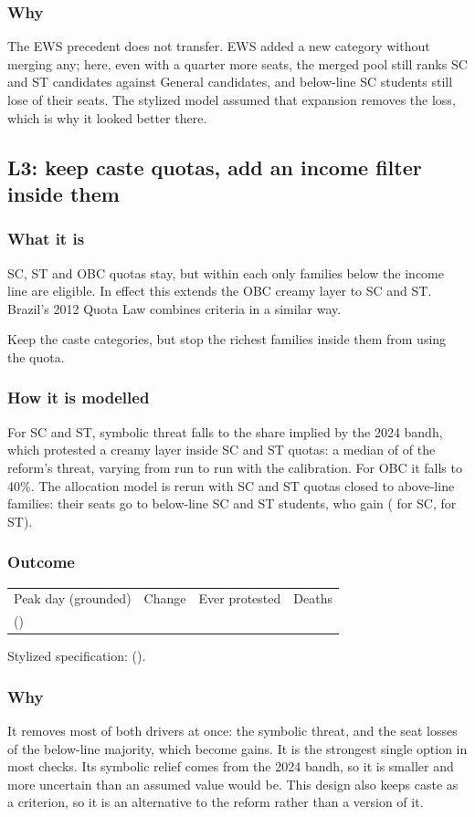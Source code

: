 \documentclass[11pt,a4paper]{article}
\makeatletter
\newcommand{\outcomeline}[6]{%
  \begin{tabular}{@{}llll@{}}
  \sffamily\small\color{muted}Peak day (grounded) & \sffamily\small\color{muted}Change & \sffamily\small\color{muted}Ever protested & \sffamily\small\color{muted}Deaths\\
  \textbf{#1} \small(#2) & \textbf{#3} & #4 & #5\\
  \end{tabular}\par\smallskip
  {\small\color{muted}Stylized specification: #6}\par}
\makeatother
\begin{document}
\subsubsection{Why}
The EWS precedent does not transfer. EWS added a new category without merging any; here, even with a quarter more seats, the merged pool still ranks SC and ST candidates against General candidates, and below-line SC students still lose \AllocExpandedSCBelow{} of their seats. The stylized model assumed that expansion removes the loss, which is why it looked better there.

\subsection{L3: keep caste quotas, add an income filter inside them}
\subsubsection{What it is}
SC, ST and OBC quotas stay, but within each only families below the income line are eligible. In effect this extends the OBC creamy layer to SC and ST. Brazil's 2012 Quota Law combines criteria in a similar way.
\begin{plainwords}Keep the caste categories, but stop the richest families inside them from using the quota.\end{plainwords}
\subsubsection{How it is modelled}
For SC and ST, symbolic threat falls to the share implied by the 2024 bandh, which protested a creamy layer inside SC and ST quotas: a median of \LThreeRetainedMedian{} of the reform's threat, varying from run to run with the calibration. For OBC it falls to 40\%. The allocation model is rerun with SC and ST quotas closed to above-line families: their seats go to below-line SC and ST students, who gain (\AllocFilterSCBelow{} for SC, \AllocFilterSTBelow{} for ST).
\subsubsection{Outcome}
\outcomeline{\PeakGroundedHybridCasteSubquotas}{\PeakRangeGroundedHybridCasteSubquotas}{\PeakChangeGroundedHybridCasteSubquotas}{\CumulativeGroundedHybridCasteSubquotas}{\DeathsGroundedHybridCasteSubquotas}{\PeakCentralHybridCasteSubquotas{} (\PeakChangeCentralHybridCasteSubquotas).}
\subsubsection{Why}
It removes most of both drivers at once: the symbolic threat, and the seat losses of the below-line majority, which become gains. It is the strongest single option in most checks. Its symbolic relief comes from the 2024 bandh, so it is smaller and more uncertain than an assumed value would be. This design also keeps caste as a criterion, so it is an alternative to the reform rather than a version of it.
\end{document}
